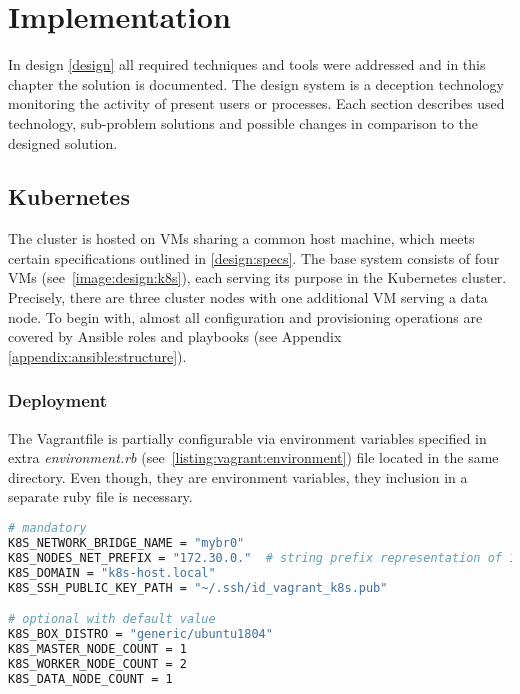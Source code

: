 \chapter{Implementation \label{implementation}}
In design \autoref{design} all required techniques and tools were addressed and in this chapter the solution is documented. The design system is a deception technology monitoring the activity of present users or processes. Each section describes used technology, sub-problem solutions and possible changes in comparison to the designed solution.

\section{Kubernetes \label{implementation:k8s}}
The cluster is hosted on VMs sharing a common host machine, which meets certain specifications outlined in \autoref{design:specs}. The base system consists of four VMs (see~\autoref{image:design:k8s}), each serving its purpose in the Kubernetes cluster. Precisely, there are three cluster nodes with one additional VM serving a data node. To begin with, almost all configuration and provisioning operations are covered by Ansible roles and playbooks (see Appendix \autoref{appendix:ansible:structure}).

\subsection{Deployment \label{implementation:k8s:deploy}}
The Vagrantfile is partially configurable via environment variables specified in extra \textit{environment.rb} (see~\autoref{listing:vagrant:environment}) file located in the same directory. Even though, they are environment variables, they inclusion in a separate ruby file is necessary.

\begin{lstlisting}[language=bash, style=custom, caption={Contents of the \textit{environment.rb}. These all available variables to configure a new deployment in different environment. Applying these variables, Vagrant create four (one master, two worker and one data node) based on \textit{generic/ubuntu1804} box. Furthermore connects each node to \textit{mybr0} network bridge and sequentially assigns IP addresses and hostnames based on the \texttt{172.30.0.0/24} network and \texttt{k8s-host.local} higher level domain respectively.}, label=listing:vagrant:environment]
# mandatory 
K8S_NETWORK_BRIDGE_NAME = "mybr0"
K8S_NODES_NET_PREFIX = "172.30.0."  # string prefix representation of 172.30.0.0/24
K8S_DOMAIN = "k8s-host.local"
K8S_SSH_PUBLIC_KEY_PATH = "~/.ssh/id_vagrant_k8s.pub"

# optional with default value
K8S_BOX_DISTRO = "generic/ubuntu1804"
K8S_MASTER_NODE_COUNT = 1
K8S_WORKER_NODE_COUNT = 2
K8S_DATA_NODE_COUNT = 1
\end{lstlisting}

